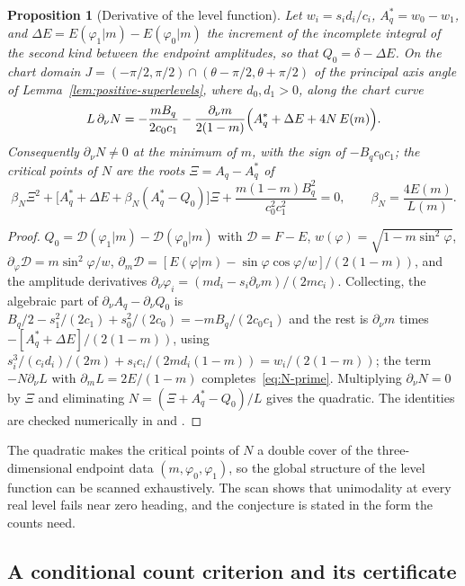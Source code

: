 \documentclass[11pt]{article}
\newtheorem{proposition}[theorem]{Proposition}
\theoremstyle{remark}
\begin{document}
\begin{proposition}[Derivative of the level function]\label{prop:N-prime}
Let $w_i=s_id_i/c_i$, $A_q^*=w_0-w_1$, and
$\Delta E=E(\varphi_1|m)-E(\varphi_0|m)$ the increment of the incomplete
integral of the second kind between the endpoint amplitudes, so that
$Q_0=\delta-\Delta E$.  On the chart domain
$J=(-\pi/2,\pi/2)\cap(\theta-\pi/2,\theta+\pi/2)$ of the principal axis
angle of Lemma~\ref{lem:positive-superlevels}, where $d_0,d_1>0$, along
the chart curve
\begin{equation}\label{eq:N-prime}
 L\,\partial_\nu N=-\frac{mB_q}{2c_0c_1}
 -\frac{\partial_\nu m}{2(1-m)}\Bigl(A_q^*+\Delta E+4N\,E(m)\Bigr).
\end{equation}
Consequently $\partial_\nu N\ne0$ at the minimum of $m$, with the sign of
$-B_qc_0c_1$; the critical points of $N$ are the roots $\Xi=A_q-A_q^*$ of
\[
 \beta_N \Xi^2+\bigl[A_q^*+\Delta E+\beta_N(A_q^*-Q_0)\bigr]\Xi+\frac{m(1-m)B_q^2}{c_0^2c_1^2}=0,
 \qquad \beta_N=\frac{4E(m)}{L(m)}.
\]
\end{proposition}
\begin{proof}
$Q_0=\mathcal D(\varphi_1|m)-\mathcal D(\varphi_0|m)$ with $\mathcal D=F-E$,
$w(\varphi)=\sqrt{1-m\sin^2\varphi}$, $\partial_\varphi
\mathcal D=m\sin^2\varphi/w$, $\partial_m\mathcal D=[E(\varphi|m)-\sin\varphi\cos\varphi/w]/(2(1-m))$,
and the amplitude derivatives $\partial_\nu\varphi_i=(md_i-s_i\partial_\nu m)/(2mc_i)$.
Collecting, the algebraic part of $\partial_\nu A_q-\partial_\nu Q_0$ is
$B_q/2-s_1^2/(2c_1)+s_0^2/(2c_0)=-mB_q/(2c_0c_1)$ and the rest is
$\partial_\nu m$ times $-[A_q^*+\Delta E]/(2(1-m))$, using
$s_i^3/(c_id_i)/(2m)+s_ic_i/(2md_i(1-m))=w_i/(2(1-m))$; the term
$-N\partial_\nu L$ with $\partial_mL=2E/(1-m)$ completes~\eqref{eq:N-prime}.
Multiplying $\partial_\nu N=0$ by $\Xi$ and eliminating $N=(\Xi+A_q^*-Q_0)/L$
gives the quadratic.  The identities are checked
numerically in  and
.
\end{proof}

The quadratic makes the critical points of $N$ a double cover of the
three-dimensional endpoint data $(m,\varphi_0,\varphi_1)$, so the global
structure of the level function can be scanned exhaustively.  The scan
shows that unimodality at every real level fails near zero heading, and
the conjecture is stated in the form the counts need.

\subsection*{A conditional count criterion and its certificate}
\end{document}
